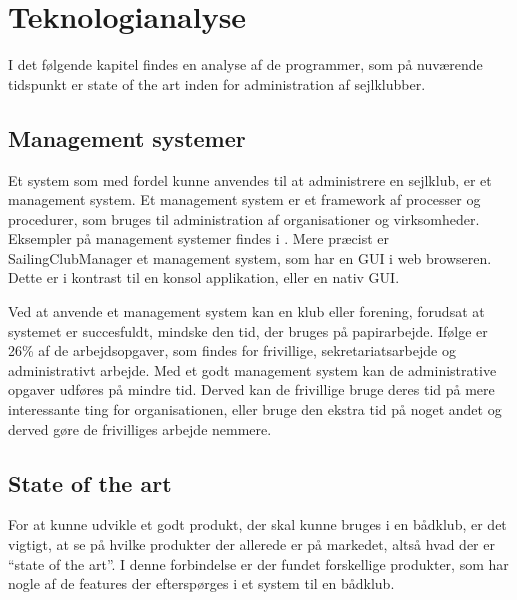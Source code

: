\chapter{Teknologianalyse}\label{chap:teknologi-analyse}

I det følgende kapitel findes en analyse af de programmer, som på nuværende tidspunkt er state of the art inden for administration af sejlklubber.


\section{Management systemer}\label{subsec:management-systemer}

Et system som med fordel kunne anvendes til at administrere en sejlklub, er et management system. 
Et management system er et framework af processer og procedurer, som bruges til administration af organisationer og virksomheder.
Eksempler på management systemer findes i . 
Mere præcist er SailingClubManager et management system, som har en \ac{GUI} i web browseren.
Dette er i kontrast til en konsol applikation, eller en nativ \ac{GUI}. 

Ved at anvende et management system kan en klub eller forening, forudsat at systemet er succesfuldt, mindske den tid, der bruges på papirarbejde. 
Ifølge \citet{Frivilligrapporten} er 26\% af de arbejdsopgaver, som findes for frivillige, sekretariatsarbejde og administrativt arbejde. 
Med et godt management system kan de administrative opgaver udføres på mindre tid. 
Derved kan de frivillige bruge deres tid på mere interessante ting for organisationen, eller bruge den ekstra tid på noget andet og derved gøre de frivilliges arbejde nemmere.


\section{State of the art}\label{sec:sota}

For at kunne udvikle et godt produkt, der skal kunne bruges i en bådklub, er det vigtigt, at se på hvilke produkter der allerede er på markedet, altså hvad der er ``state of the art''. 
I denne forbindelse er der fundet forskellige produkter, som har nogle af de features der efterspørges i et system til en bådklub.


